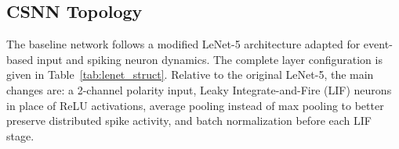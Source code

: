 \documentclass[conference]{IEEEtran}
\begin{document}
\subsection{CSNN Topology}
The baseline network follows a modified LeNet-5 architecture adapted for event-based input and spiking neuron dynamics. The complete layer configuration is given in Table~\ref{tab:lenet_struct}. Relative to the original LeNet-5, the main changes are: a 2-channel polarity input, Leaky Integrate-and-Fire (LIF) neurons in place of ReLU activations, average pooling instead of max pooling to better preserve distributed spike activity, and batch normalization before each LIF stage.

\begin{table}[t]
\caption{LeNet-5 Sparse CSNN -- Layer Configuration (Per Timestep, Shared Weights)}
\centering
\scriptsize
\setlength{\tabcolsep}{3.2pt}
\end{table}
\end{document}
